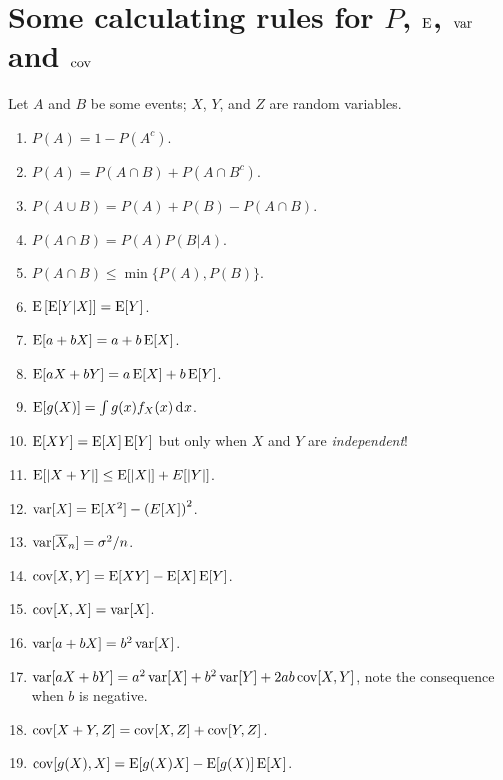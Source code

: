 \documentclass[twoside]{article}
\begin{document}
\section{Some calculating rules for $P$, $\operatorname{E}$, $\operatorname{var}$ and $\operatorname{cov}$}
Let $A$ and $B$ be some events; $X$, $Y$, and $Z$ are random variables.
\begin{enumerate}
\item $P(A) = 1 - P(A^c)$.
\item $P(A) = P(A\cap B) + P(A\cap B^c)$.
\item $P(A\cup B) = P(A) + P(B) - P(A\cap B)$.
\item $P(A \cap B) = P(A)P(B|A)$.
\item $P(A\cap B) \leq \min\{P(A), P(B)\}$.
\item $\operatorname{E}\left[\operatorname{E}[Y|X]\right] = \operatorname{E}[Y]$.
\item $\operatorname{E}[a + bX ] = a + b\operatorname{E}[X]$.
\item $\operatorname{E}[a X + b Y] = a\operatorname{E}[X] + b\operatorname{E}[Y]$.
\item $\E[g(X)] = \int g(x) f_X(x) \rd x$.
\item $\operatorname{E}[XY] = \operatorname{E}[X]\operatorname{E}[Y]$ but only when $X$ and $Y$ are \emph{independent}!
\item $\operatorname{E}[|X+Y|] \leq \operatorname{E}[|X|] + E[|Y|]$.
\item $\operatorname{var}[X] = \operatorname{E}[X^2] - \left(E[X]\right)^2$.
\item $\operatorname{var}[\overline{X}_n] = \sigma^2 / n$.
\item $\operatorname{cov}[X,Y] = \operatorname{E}[XY] - \operatorname{E}[X]\operatorname{E}[Y]$.
\item $\operatorname{cov}[X,X] = \operatorname{var}[X]$.
\item $\operatorname{var}[a + bX] = b^2 \operatorname{var}[X]$.
\item $\operatorname{var}[a X + b Y] = a^2 \operatorname{var}[X] + b^2 \operatorname{var}[Y] + 2 a b \operatorname{cov}[X,Y]$, note the consequence when $b$ is negative.
\item $\operatorname{cov}[X+Y,Z] =  \operatorname{cov}[X,Z] + \operatorname{cov}[Y,Z]$.
\item $\operatorname{cov}[g(X),X] = \operatorname{E}[g(X)X]  - \operatorname{E}[g(X)]\operatorname{E}[X]$.
\end{enumerate}

\newpage
{}



\clearpage
\end{document}
